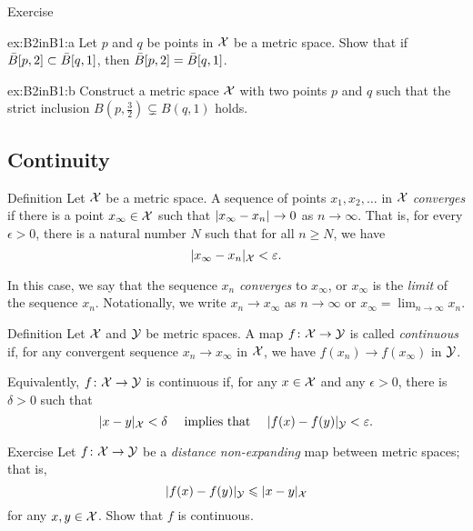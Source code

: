 \begin{thm}{Exercise}\label{ex:B2inB1}

\begin{subthm}{ex:B2inB1:a}
Let $p$ and $q$ be points in $\mathcal{X}$ be a metric space.
Show that if $\bar B[p,2]\z\subset \bar B[q,1]$, then $\bar B[p,2]\z=\bar B[q,1]$.
\end{subthm}

\begin{subthm}{ex:B2inB1:b}
Construct a metric space $\mathcal{X}$ with two points $p$ and $q$ such that the strict inclusion
$B(p,\tfrac32)\subsetneq B(q,1)$ holds.
\end{subthm}

\end{thm}



\subsection*{Continuity}

\begin{thm}{Definition}
 Let ${\mathcal{X}}$ be a metric space.
A sequence of points $x_1, x_2, \ldots$ in ${\mathcal{X}}$ {}\emph{converges}
if there is a point
$x_\infty\in {\mathcal{X}}$ such that $\dist{x_\infty}{x_n}{}\to 0$ as $n\to\infty$.  
That is, for every $\epsilon > 0$, there is a natural number $N$ such that for all $n \ge N$, we have
\[
\dist{x_\infty}{x_n}{\spc{X}}
<
\epsilon.
\]

In this case, we say that the sequence $x_n$ {}\emph{converges} to $x_\infty$, 
or $x_\infty$ is the {}\emph{limit} of the sequence $x_n$.
Notationally, we write $x_n\to x_\infty$ as $n\to\infty$
or $x_\infty=\lim_{n\to\infty} x_n$.
\end{thm}

\begin{thm}{Definition}\label{def:continuous}
Let $\mathcal{X}$ and $\mathcal{Y}$ be metric spaces.
A map $f\colon\mathcal{X}\to \mathcal{Y}$ is called \emph{continuous} if, for any convergent sequence $x_n\to x_\infty$ in ${\mathcal{X}}$,
we have $f(x_n) \to f(x_\infty)$ in $\mathcal{Y}$.

Equivalently, $f\colon\mathcal{X}\to \mathcal{Y}$ is continuous if, for any $x\in {\mathcal{X}}$ and any $\epsilon>0$,
there is $\delta>0$ such that 
$$\dist{x}{y}{\spc{X}}<\delta\quad \text{ implies that }\quad \dist{f(x)}{f(y)}{\spc{Y}}<\epsilon.$$

\end{thm}

\begin{thm}{Exercise}\label{ex:shrt=>continuous}
Let $f\colon\mathcal{X}\to \mathcal{Y}$ be a {}\emph{distance non-expanding} map between metric spaces; that is, 
\[\dist{f(x)}{f(y)}{\spc{Y}}\le \dist{x}{y}{\spc{X}}\]
for any $x,y\in \mathcal{X}$.
Show that $f$ is continuous.
\end{thm}

